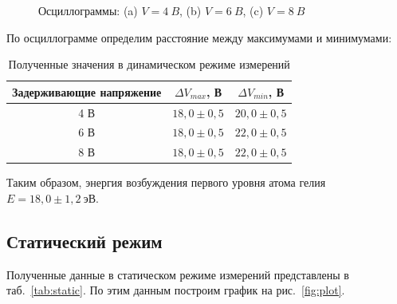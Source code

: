 \documentclass[a4paper, 12pt]{article}
\begin{document}
\begin{figure}[h]
\begin{minipage}[h]{0.3\linewidth}
		\end{minipage}
		\caption{Осциллограммы: (a) $V = 4~B$, (b) $V = 6~B$, (c) $V = 8~B$}
		\label{fig:osc}
\end{figure}

По осциллограмме определим расстояние между максимумами и минимумами:

\begin{table}[h!]
\begin{center}
\begin{tabular}{|c|c|c|}
\hline 
Задерживающие напряжение & $\Delta{V_{max}}$, В & $\Delta{V_{min}}$, В \\ 
\hline 
4 В & $18,0\pm0,5$ & $20,0\pm0,5$ \\ 
\hline 
6 В & $18,0\pm0,5$ & $22,0\pm0,5$ \\ 
\hline 
8 В & $18,0\pm0,5$ & $22,0\pm0,5$ \\ 
\hline 
\end{tabular} 
\end{center}
\caption{Полученные значения в динамическом режиме измерений}
\label{tab:dyn}
\end{table}

Таким образом, энергия возбуждения первого уровня атома гелия $E = 18,0\pm1,2~эВ$.

\subsection{Статический режим}

Полученные данные в статическом режиме измерений представлены в таб.~\ref{tab:static}. По этим данным построим график на рис.~\ref{fig:plot}.
\end{document}
